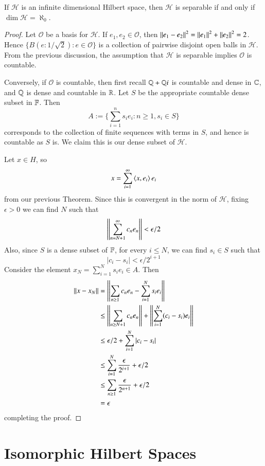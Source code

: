 \begin{prop}
    If $\mathscr{H}$ is an infinite dimensional Hilbert space, then $\mathscr{H}$ is separable if and only if $\dim\mathscr{H} = \aleph_0$.
\end{prop}
\begin{proof}
    Let $\mathscr{O}$ be a basis for $\mathscr{H}$. If $e_1,e_2 \in \mathscr{O}$, then $\left|\left| e_1-e_2\right|\right|^2 = \left|\left| e_1\right|\right|^2+\left|\left| e_2\right|\right|^2 = 2$. Hence $\{B(e:1/\sqrt{2}):e \in \mathscr{O}\}$ is a collection of pairwise disjoint open balls in $\mathscr{H}$. From the previous discussion, the assumption that $\mathscr{H}$ is separable implies $\mathscr{O}$ is countable. 

    Conversely, if $\mathscr{O}$ is countable, then first recall $\mathbb Q+\mathbb Q i$ is countable and dense in $\mathbb C$, and $\mathbb Q$ is dense and countable in $\mathbb R$. Let $S$ be the appropriate countable dense subset in $\mathbb F$. Then $$A := \{\sum_{i=1}^ns_ie_i:n\geq 1, s_i \in S\}$$
    corresponds to the collection of finite sequences with terms in $S$, and hence is countable as $S$ is. We claim this is our dense subset of $\mathscr{H}$.

    Let $x \in H$, so $$x = \sum_{i=1}^{\infty}\left\langle x, e_i\right\rangle e_i$$
    from our previous Theorem. Since this is convergent in the norm of $\mathscr{H}$, fixing $\epsilon > 0$ we can find $N$ such that $$\left|\left| \sum_{n=N+1}^{\infty}c_ne_n\right|\right| <\epsilon/2$$
    Also, since $S$ is a dense subset of $\mathbb F$, for every $i \leq N$, we can find $s_i \in S$ such that $$|c_i-s_i| <\epsilon/2^{i+1}$$
    Consider the element $x_N = \sum_{i=1}^Ns_ie_i \in A$. Then \begin{align*}
        \left|\left| x-x_N\right|\right| &= \left|\left| \sum_{n\geq 1}c_ne_n - \sum_{i=1}^Ns_ie_i\right|\right| \\
        &\leq \left|\left| \sum_{n\geq N+1}c_ne_n\right|\right|+\left|\left| \sum_{i=1}^N(c_i-s_i)e_i\right|\right| \\
        &\leq \epsilon/2 + \sum_{i=1}^N|c_i-s_i| \\
        &\leq \sum_{i=1}^N\frac{\epsilon}{2^{i+1}} + \epsilon/2 \\
        &\leq \sum_{n\geq 1}\frac{\epsilon}{2^{n+1}}+\epsilon/2 \\
        &= \epsilon
    \end{align*}
    completing the proof.
\end{proof}


\section{Isomorphic Hilbert Spaces}
\label{sec:Isom}

